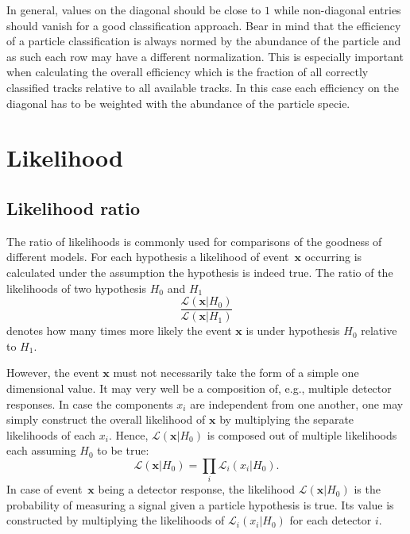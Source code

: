 In general, values on the diagonal should be close to $1$ while non-diagonal entries should vanish for a good classification approach. Bear in mind that the efficiency of a particle classification is always normed by the abundance of the particle and as such each row may have a different normalization. This is especially important when calculating the overall efficiency which is the fraction of all correctly classified tracks relative to all available tracks. In this case each efficiency on the diagonal has to be weighted with the abundance of the particle specie.

\section{Likelihood}
\label{sec:likelihood}

\subsection{Likelihood ratio}
\label{subsec:likelihood_ratios}

The ratio of likelihoods is commonly used for comparisons of the goodness of different models. For each hypothesis a likelihood of event~$\pmb{x}$ occurring is calculated under the assumption the hypothesis is indeed true. The ratio of the likelihoods of two hypothesis $H_0$ and $H_1$
\begin{equation*}
	\frac{\mathcal{L}(\pmb{x}|H_0)}{\mathcal{L}(\pmb{x}|H_1)}
\end{equation*} denotes how many times more likely the event $\pmb{x}$ is under hypothesis $H_0$ relative to $H_1$.

However, the event $\pmb{x}$ must not necessarily take the form of a simple one dimensional value. It may very well be a composition of, e.g., multiple detector responses. In case the components $x_i$ are independent from one another, one may simply construct the overall likelihood of $\pmb{x}$ by multiplying the separate likelihoods of each $x_i$. Hence, $\mathcal{L}(\pmb{x}|H_0)$ is composed out of multiple likelihoods each assuming $H_0$ to be true:
\begin{equation*}
	\mathcal{L}(\pmb{x}|H_0) = \prod \limits_{i} \mathcal{L}_i(x_i|H_0).
\end{equation*}
In case of event~$\pmb{x}$ being a detector response, the likelihood $\mathcal{L}(\pmb{x}|H_0)$ is the probability of measuring a signal given a particle hypothesis is true. Its value is constructed by multiplying the likelihoods of $\mathcal{L}_i(x_i|H_0)$ for each detector $i$.


